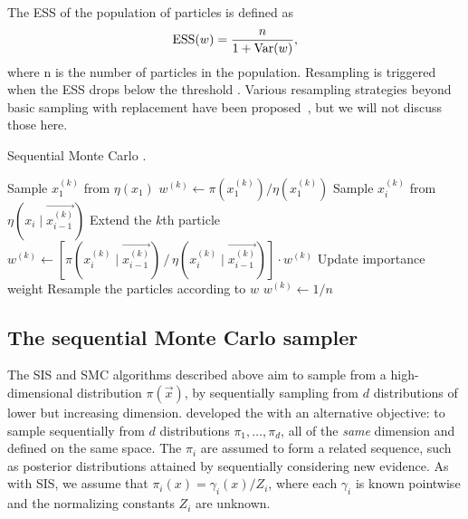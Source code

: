  The \gls{ESS} of the
population of particles is defined as 
\[ 
  \operatorname{ESS}(w) = \frac{n}{1 + \operatorname{Var}(w)}, 
\]
where \gls{n} is the number of particles in the population. Resampling is
triggered when the \gls{ESS} drops below the threshold .  Various
resampling strategies beyond basic sampling with replacement have been
proposed~\autocite{douc2005comparison}, but we will not discuss those here. 

\begin{algorithm}
  \caption{Sequential Monte Carlo \autocite{doucet2000sequential}.}
  \begin{algorithmic}
      \State Sample $x_1^{(k)}$ from $\eta(x_1)$
      \State $w^{(k)} \gets \pi(x_1^{(k)}) / \eta(x_1^{(k)})$
    \EndFor
        \State Sample $x_i^{(k)}$ from $\eta(x_i \mid \vec{x_{i-1}^{(k)}})$
        \Comment Extend the $k$th particle
        \State $w^{(k)} \gets [\pi(x_i^{(k)} \mid \vec{x_{i-1}^{(k)}}) \,/\, \eta(x_i^{(k)} \mid \vec{x_{i-1}^{(k)}})] \cdot w^{(k)}$
        \Comment Update importance weight
      \EndFor
        \State Resample the particles according to $w$
          \State $w^{(k)} \gets 1/n$
        \EndFor
      \EndIf
    \EndFor
  \end{algorithmic}
  \label{alg:smc}
\end{algorithm}

\subsection{The sequential Monte Carlo sampler}
\label{subsec:smcsamp}

The \gls{SIS} and \gls{SMC} algorithms described above aim to sample from a
high-dimensional distribution $\pi(\vec{x})$, by sequentially sampling from $d$
distributions of lower but increasing dimension. \textcite{del2006sequential}
developed the  with an alternative objective: to sample
sequentially from $d$ distributions $\pi_1, \ldots, \pi_d$, all of the
\emph{same} dimension and defined on the same space. The $\pi_i$ are assumed to
form a related sequence, such as posterior distributions attained by
sequentially considering new evidence. As with \gls{SIS}, we assume that
$\pi_i(x) = \gamma_i(x) / Z_i$, where each $\gamma_i$ is known pointwise and
the normalizing constants $Z_i$ are unknown.

